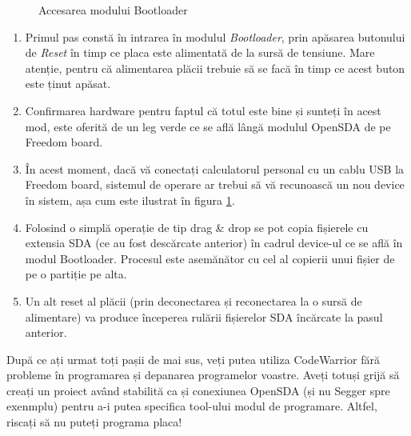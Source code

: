 \begin{figure}
    \vspace{-25pt}
    \vspace{-20pt}
    \caption{\label{fig:CodeWarrior-OSDevice} Accesarea modului Bootloader}
    \vspace{-25pt}
\end{figure}

\begin{enumerate}
    \item Primul pas constă în intrarea în modulul \textit{Bootloader}, prin apăsarea butonului de \textit{Reset} în timp ce placa este alimentată de la sursă de tensiune. Mare atenție, pentru că alimentarea plăcii trebuie să se facă în timp ce acest buton este ținut apăsat.
    \item Confirmarea hardware pentru faptul că totul este bine și sunteți în acest mod, este oferită de un leg verde ce se află lângă modulul OpenSDA de pe Freedom board.
    \item În acest moment, dacă vă conectați calculatorul personal cu un cablu USB la Freedom board, sistemul de operare ar trebui să vă recunoască un nou device în sistem, așa cum este ilustrat în figura \ref{fig:CodeWarrior-OSDevice}.
    \item Folosind o simplă operație de tip drag \& drop se pot copia fișierele cu extensia SDA (ce au fost descărcate anterior) în cadrul device-ul ce se află în modul Bootloader. Procesul este asemănător cu cel al copierii unui fișier de pe o partiție pe alta.
    \item Un alt reset al plăcii (prin deconectarea și reconectarea la o sursă de alimentare) va produce începerea rulării fișierelor SDA încărcate la pasul anterior.
\end{enumerate}

După ce ați urmat toți pașii de mai sus, veți putea utiliza CodeWarrior fără probleme în programarea și depanarea programelor voastre. Aveți totuși grijă să creați un proiect având stabilită ca și conexiunea OpenSDA (și nu Segger spre exenmplu) pentru a-i putea specifica tool-ului modul de programare. Altfel, riscați să nu puteți programa placa!

